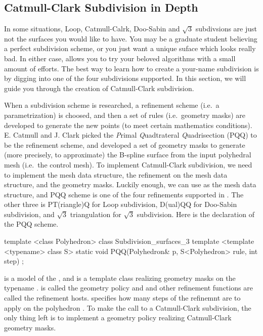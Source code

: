 \subsection{Catmull-Clark Subdivision in Depth}
In some situations, Loop, Catmull-Calrk, Doo-Sabin and $\sqrt{3}$ 
subdivsions are just not the surfaces you would like to have. You 
may be a graduate student believing a perfect subdivision scheme, or
you just want a unique suface which looks really bad. In either case,
 allows you to try your beloved algorithms
with a small amount of efforts. The best way to learn how to create
a your-name subdivision is by digging into one of the four subdivisions
 supported. In this section, we will guide 
you through the creation of Catmull-Clark subdivision.

When a subdivision scheme is researched, a refinement scheme (i.e.~a 
parametrization) is choosed, and then a set of rules (i.e.~geometry 
masks) are developed to generate the new points (to meet certain 
mathematics conditions). E. Catmull and J. Clark picked the \emph{P}rimal 
\emph{Q}uadtrateral \emph{Q}uadrisection (PQQ) to be the refinement scheme,
and developed a set of geometry masks to generate (more precisely, to 
approximate) the B-spline surface from the input polyhedral mesh (i.e.~the 
control mesh). To implement Catmull-Clark subdivision, we need to 
implement the mesh data structure, the refinement on the mesh data 
structure, and the geometry masks. Luckily enough, we can use 
 as the mesh data structure, and PQQ scheme 
is one of the four refinements supported in . 
The other three is PT(riangle)Q for Loop subdivision, D(ual)QQ for 
Doo-Sabin subdivision, and $\sqrt{3}$ triangulation for $\sqrt{3}$ 
subdivision. Here is the declaration of the PQQ scheme.

\begin{ccExampleCode}
template <class Polyhedron>
class Subdivision_surfaces_3 {
  template <template <typename> class S>
  static void PQQ(Polyhedron& p, S<Polyhedron> rule, int step)
};
\end{ccExampleCode}

 is a model of the , and
 is a template class realizing geometry masks on the typename 
.  is called the
geometry policy and  and other refinement functions are 
called the refinement hosts.  specifies how many steps of the 
refinemnt are to apply on the polyhedron . To make the call to
 a Catmull-Clark subdivision, the only thing left is to
implement a geometry policy realizing Catmull-Clark geometry masks.

